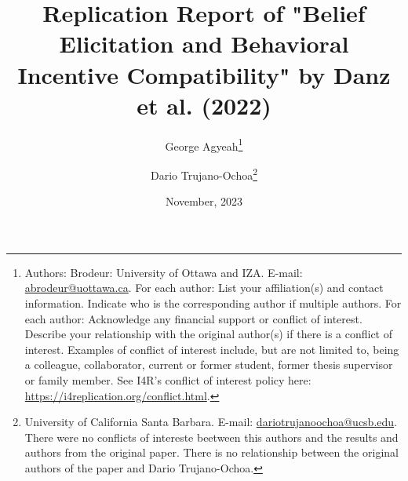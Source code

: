\documentclass[12pt,a4paper]{article}
\begin{document}
	
	\date{November, 2023}
	
	\title{Replication Report of "Belief Elicitation and Behavioral Incentive Compatibility" by  Danz et al. (2022)}
	\author{
		George Agyeah\thanks{Authors: 
			Brodeur: University of Ottawa and IZA. E-mail: \href{mailto:abrodeur@uottawa.ca}%
			{abrodeur@uottawa.ca}. For each author: List your affiliation(s) and contact information. Indicate who is the corresponding author if multiple authors. For each author: Acknowledge any financial support or conflict of interest. Describe your relationship with the original author(s) if there is a conflict of interest. Examples of conflict of interest include, but are not limited to, being a colleague, collaborator, current or former student, former thesis supervisor or family member. See I4R’s conflict of interest policy here: \url{https://i4replication.org/conflict.html}.} \and 
		Dario Trujano-Ochoa\thanks{University of California Santa Barbara. E-mail: \href{dariotrujanoochoa@ucsb.edu}%
			{dariotrujanoochoa@ucsb.edu}. There were no conflicts of intereste beetween this authors and the results and authors from the original paper. There is no relationship between the original authors of the paper and Dario Trujano-Ochoa.}}
	
	\maketitle
	
\end{document}
